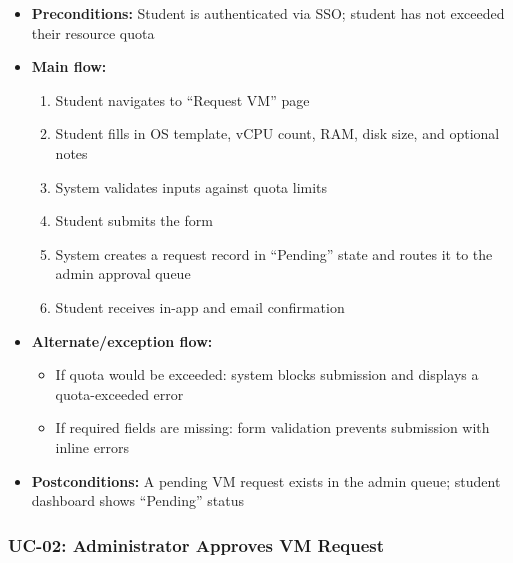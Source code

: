 \documentclass[12pt,letterpaper]{article}
\begin{document}
\begin{itemize}
  \item \textbf{Preconditions:} Student is authenticated via SSO; student has not exceeded their resource quota
  \item \textbf{Main flow:}
    \begin{enumerate}
      \item Student navigates to ``Request VM'' page
      \item Student fills in OS template, vCPU count, RAM, disk size, and optional notes
      \item System validates inputs against quota limits
      \item Student submits the form
      \item System creates a request record in ``Pending'' state and routes it to the admin approval queue
      \item Student receives in-app and email confirmation
    \end{enumerate}
  \item \textbf{Alternate/exception flow:}
    \begin{itemize}
      \item If quota would be exceeded: system blocks submission and displays a quota-exceeded error
      \item If required fields are missing: form validation prevents submission with inline errors
    \end{itemize}
  \item \textbf{Postconditions:} A pending VM request exists in the admin queue; student dashboard shows ``Pending'' status
\end{itemize}

\subsubsection*{UC-02: Administrator Approves VM Request}
\end{document}
